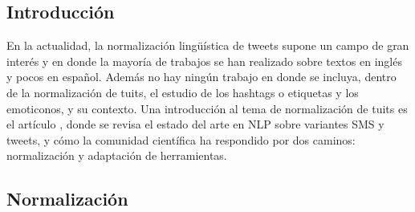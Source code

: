 \documentclass[spanish,12pt, a4paper,twoside]{paper}
\begin{document}
\subsection{Introducción}\label{sec:introduccion}
En la actualidad, la normalización lingüística de tweets \cite{baldwin:2011} supone un campo de gran interés y en donde la mayoría de trabajos se han realizado sobre textos en inglés y pocos en español. Además no hay ningún trabajo en donde se incluya, dentro de la normalización de tuits, el estudio de los hashtags o etiquetas y los emoticonos, y su contexto. 
Una introducción al tema de normalización de tuits es el artículo \cite{eisenstein:2013}, donde se revisa el estado del arte en NLP sobre variantes SMS y tweets, y cómo la comunidad científica ha respondido por dos caminos: normalización y adaptación de herramientas.
\subsection{Normalización}\label{sec:normalizacion}
\end{document}
